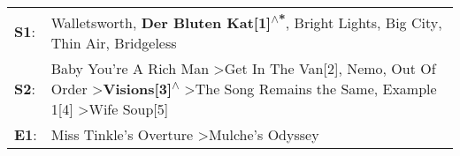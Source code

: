 \begin{supertabular}{p{0.03\textwidth}p{0.92\textwidth}}
 \textbf{S1}:  &                                                                                                                                                                                    Walletsworth\textsuperscript{}, \enspace \textbf{Der Bluten Kat[1]\textsuperscript{$\wedge$*}}, \enspace Bright Lights, Big City\textsuperscript{}, \enspace Thin Air\textsuperscript{}, \enspace Bridgeless\textsuperscript{}  \enspace  \\
 \textbf{S2}:  &  Baby You're A Rich Man\textsuperscript{} \textgreater \enspace Get In The Van[2]\textsuperscript{}, \enspace Nemo\textsuperscript{}, \enspace Out Of Order\textsuperscript{} \textgreater \enspace \textbf{Visions[3]\textsuperscript{$\wedge$}} \textgreater \enspace The Song Remains the Same\textsuperscript{}, \enspace Example 1[4]\textsuperscript{} \textgreater \enspace Wife Soup[5]\textsuperscript{}  \enspace  \\
 \textbf{E1}:  &                                                                                                                                                                                                                                                                                                                 Miss Tinkle's Overture\textsuperscript{} \textgreater \enspace Mulche's Odyssey\textsuperscript{}  \enspace  \\
\end{supertabular}
